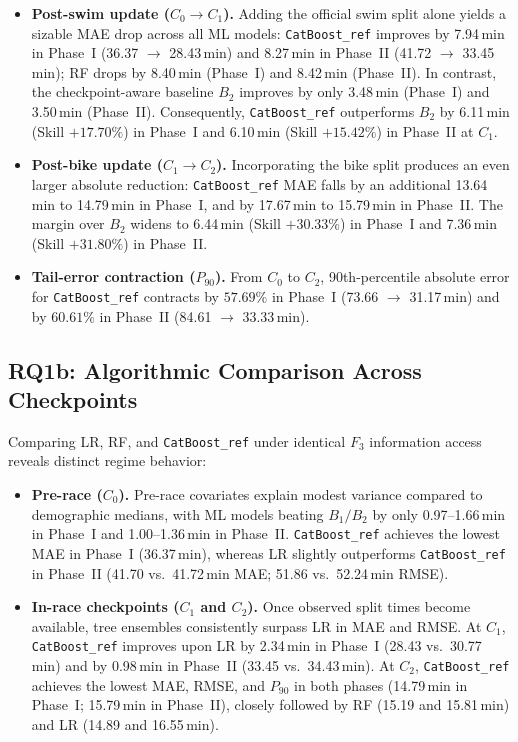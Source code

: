 \documentclass[11pt,a4paper]{article}
\begin{document}
\begin{itemize}[leftmargin=*]
  \item \textbf{Post-swim update ($C_0 \to C_1$).} Adding the official
  swim split alone yields a sizable MAE drop across all ML models:
  \texttt{CatBoost\_ref} improves by 7.94\,min in Phase~I
  (36.37 $\to$ 28.43\,min) and 8.27\,min in Phase~II
  (41.72 $\to$ 33.45\,min); RF drops by 8.40\,min (Phase~I) and
  8.42\,min (Phase~II). In contrast, the checkpoint-aware baseline
  $B_2$ improves by only 3.48\,min (Phase~I) and 3.50\,min (Phase~II).
  Consequently, \texttt{CatBoost\_ref} outperforms $B_2$ by 6.11\,min
  (Skill $+17.70\%$) in Phase~I and 6.10\,min (Skill $+15.42\%$) in
  Phase~II at $C_1$.

  \item \textbf{Post-bike update ($C_1 \to C_2$).} Incorporating the
  bike split produces an even larger absolute reduction:
  \texttt{CatBoost\_ref} MAE falls by an additional 13.64\,min to
  14.79\,min in Phase~I, and by 17.67\,min to 15.79\,min in Phase~II.
  The margin over $B_2$ widens to 6.44\,min (Skill $+30.33\%$) in
  Phase~I and 7.36\,min (Skill $+31.80\%$) in Phase~II.

  \item \textbf{Tail-error contraction ($P_{90}$).} From $C_0$ to
  $C_2$, 90th-percentile absolute error for \texttt{CatBoost\_ref}
  contracts by $57.69\%$ in Phase~I (73.66 $\to$ 31.17\,min) and by
  $60.61\%$ in Phase~II (84.61 $\to$ 33.33\,min).
\end{itemize}

\subsection{RQ1b: Algorithmic Comparison Across Checkpoints}

Comparing LR, RF, and \texttt{CatBoost\_ref} under identical $F_3$
information access reveals distinct regime behavior:

\begin{itemize}[leftmargin=*]
  \item \textbf{Pre-race ($C_0$).} Pre-race covariates explain modest
  variance compared to demographic medians, with ML models beating
  $B_1/B_2$ by only 0.97--1.66\,min in Phase~I and 1.00--1.36\,min in
  Phase~II. \texttt{CatBoost\_ref} achieves the lowest MAE in Phase~I
  (36.37\,min), whereas LR slightly outperforms \texttt{CatBoost\_ref}
  in Phase~II (41.70 vs.\ 41.72\,min MAE; 51.86 vs.\ 52.24\,min RMSE).

  \item \textbf{In-race checkpoints ($C_1$ and $C_2$).} Once observed
  split times become available, tree ensembles consistently surpass LR
  in MAE and RMSE. At $C_1$, \texttt{CatBoost\_ref} improves upon LR
  by 2.34\,min in Phase~I (28.43 vs.\ 30.77\,min) and by 0.98\,min in
  Phase~II (33.45 vs.\ 34.43\,min). At $C_2$, \texttt{CatBoost\_ref}
  achieves the lowest MAE, RMSE, and $P_{90}$ in both phases
  (14.79\,min in Phase~I; 15.79\,min in Phase~II), closely followed by
  RF (15.19 and 15.81\,min) and LR (14.89 and 16.55\,min).
\end{itemize}
\end{document}
